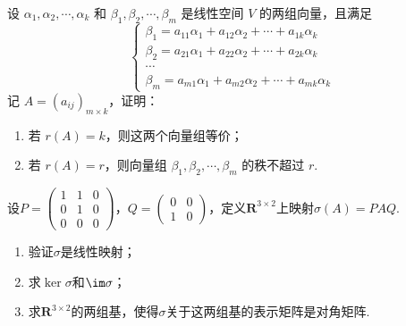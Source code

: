 \begin{exercise}
\begin{exgroup}
        \item 设 $\alpha_1, \alpha_2, \cdots, \alpha_k$ 和 $\beta_1, \beta_2, \cdots, \beta_m$ 是线性空间 $V$ 的两组向量，且满足
        \[ \begin{cases}
                \beta_1 = a_{11} \alpha_1 + a_{12} \alpha_2 + \cdots + a_{1k} \alpha_k \\
                \beta_2 = a_{21} \alpha_1 + a_{22} \alpha_2 + \cdots + a_{2k} \alpha_k \\
                \cdots \\
                \beta_m = a_{m1} \alpha_1 + a_{m2} \alpha_2 + \cdots + a_{mk} \alpha_k
        \end{cases} \]
        记 $A = (a_{ij})_{m \times k}$，证明：
        \begin{enumerate}
            \item 若 $r(A) = k$，则这两个向量组等价；
            \item 若 $r(A) = r$，则向量组 $\beta_1, \beta_2, \cdots, \beta_m$ 的秩不超过 $r$.
        \end{enumerate}
        \begin{answer}

        \end{answer}

        \item 设$P=\begin{pmatrix}
                1 & 1 & 0 \\ 0 & 1 & 0 \\ 0 & 0 & 0
            \end{pmatrix}$，$Q=\begin{pmatrix}
                0 & 0 \\ 1 & 0
            \end{pmatrix}$，定义$\mathbf{R}^{3\times 2}$上映射$\sigma(A)=PAQ$.
        \begin{enumerate}
            \item 验证$\sigma$是线性映射；

            \item 求$\ker\sigma$和$\im \sigma$；

            \item 求$\mathbf{R}^{3\times 2}$的两组基，使得$\sigma$关于这两组基的表示矩阵是对角矩阵.
        \end{enumerate}


\end{exgroup}
\end{exercise}
